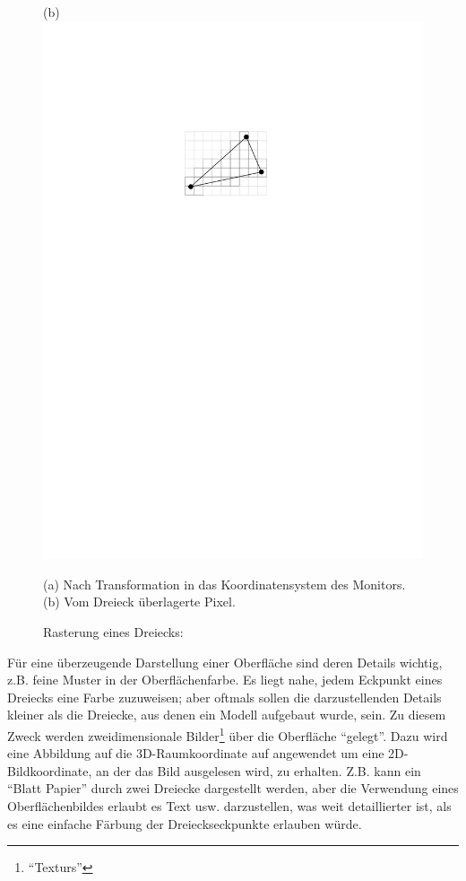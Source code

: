 \documentclass[twoside,a4paper,fleqn,12pt]{book}
\begin{document}
\begin{figure}[h]
  (b) \includegraphics[scale=0.8]{triraster2}
  \caption{Rasterung eines Dreiecks:}
  \small (a) Nach Transformation in das Koordinatensystem des Monitors.\\
  (b) Vom Dreieck überlagerte Pixel.
  \label{fig:triraster}
\end{figure}

Für eine überzeugende Darstellung einer Oberfläche sind deren Details wichtig, z.B. feine Muster in der Oberflächenfarbe.
Es liegt nahe, jedem Eckpunkt eines Dreiecks eine Farbe zuzuweisen; aber oftmals sollen die darzustellenden Details kleiner als die Dreiecke, aus denen
ein Modell aufgebaut wurde, sein.
Zu diesem Zweck werden zweidimensionale Bilder\footnote{"`\glspl{Textur}"'}
über die Oberfläche "`gelegt"'. Dazu wird eine Abbildung auf die 3D-Raumkoordinate auf angewendet um eine 2D-Bildkoordinate,
an der das Bild ausgelesen wird, zu erhalten. Z.B. kann ein "`Blatt Papier"' durch zwei Dreiecke dargestellt werden, aber die Verwendung
eines Oberflächenbildes erlaubt es Text usw. darzustellen, was weit detaillierter ist, als es eine einfache Färbung der Dreieckseckpunkte erlauben würde.
\end{document}
